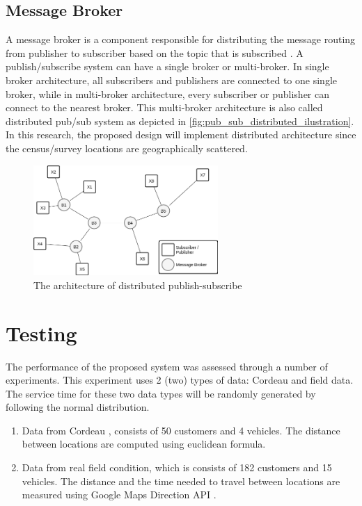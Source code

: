 \documentclass[conference]{IEEEtran}
\begin{document}
\subsection{Message Broker}
\label{ssec:message-broker}
A message broker is a component responsible for distributing the message routing from publisher to subscriber based on the topic that is subscribed \cite{banavar_efficient_1999}. A publish/subscribe system can have a single broker or multi-broker. In single broker architecture, all subscribers and publishers are connected to one single broker, while in multi-broker architecture, every subscriber or publisher can connect to the nearest broker. This multi-broker architecture is also called distributed pub/sub system \cite{muhl_large-scale_2002} as depicted in \autoref{fig:pub_sub_distributed_ilustration}. In this research, the proposed design will implement distributed architecture since the census/survey locations are geographically scattered. 


\begin{figure}[h]
	\centering
	\includegraphics[width=7cm]{Resources/Images/pub_sub_distributed_ilustration}
	\caption{The architecture of distributed publish-subscribe}
	\label{fig:pub_sub_distributed_ilustration}
\end{figure}


\section{Testing}
\label{sec:testing}
The performance of the proposed system was assessed through a number of experiments. This experiment uses 2 (two) types of data: Cordeau and field data. The service time for these two data types will be randomly generated by following the normal distribution. 


\begin{enumerate}
	\item Data from Cordeau \cite{cordeau_tabu_1997}, consists of 50 customers and 4 vehicles. The distance between locations are computed using euclidean formula. 
	\item Data from real field condition, which is consists of 182 customers and 15 vehicles. The distance and the time needed to travel between locations are measured using Google Maps Direction API \cite{google_google_2016}. 
\end{enumerate}
\end{document}
